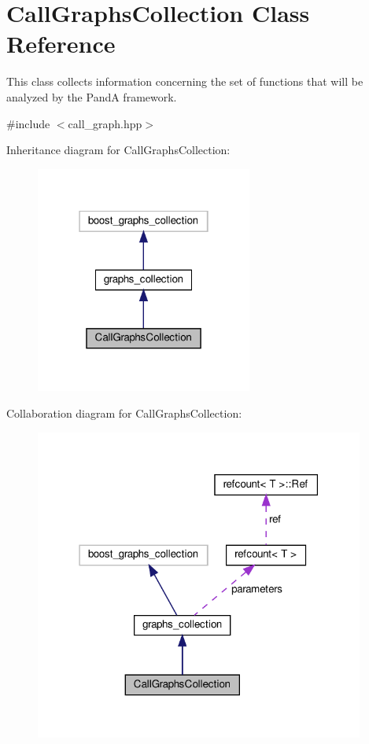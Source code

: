 \hypertarget{classCallGraphsCollection}{}\section{Call\+Graphs\+Collection Class Reference}
\label{classCallGraphsCollection}


This class collects information concerning the set of functions that will be analyzed by the PandA framework.  




{\ttfamily \#include $<$call\+\_\+graph.\+hpp$>$}



Inheritance diagram for Call\+Graphs\+Collection\+:
\nopagebreak
\begin{figure}[H]
\begin{center}
\leavevmode
\includegraphics[width=202pt]{d3/d3c/classCallGraphsCollection__inherit__graph}
\end{center}
\end{figure}


Collaboration diagram for Call\+Graphs\+Collection\+:
\nopagebreak
\begin{figure}[H]
\begin{center}
\leavevmode
\includegraphics[width=307pt]{dc/daa/classCallGraphsCollection__coll__graph}
\end{center}
\end{figure}
